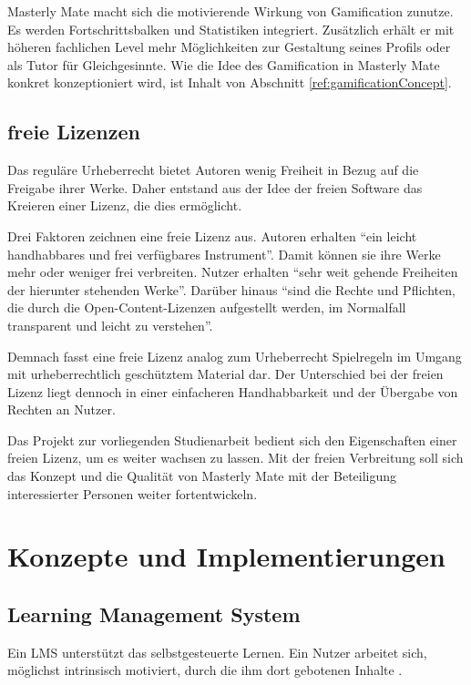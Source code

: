 Masterly Mate macht sich die motivierende Wirkung von Gamification zunutze. Es
werden Fortschrittsbalken und Statistiken integriert. Zusätzlich erhält er mit
höheren fachlichen Level mehr Möglichkeiten zur Gestaltung seines Profils oder
als Tutor für Gleichgesinnte. Wie die Idee des Gamification in Masterly Mate
konkret konzeptioniert wird, ist Inhalt von Abschnitt
\ref{ref:gamificationConcept}.

\subsection{freie Lizenzen}\label{ref:freeLicenses}
Das reguläre Urheberrecht bietet Autoren wenig Freiheit in Bezug auf die
Freigabe ihrer Werke. Daher entstand aus der Idee der freien Software das
Kreieren einer Lizenz, die dies ermöglicht.

Drei Faktoren zeichnen eine freie Lizenz aus. Autoren erhalten "`ein leicht
handhabbares und frei verfügbares Instrument"'\cite{kreutzer:2011}. Damit können
sie ihre Werke mehr oder weniger frei verbreiten. Nutzer erhalten "`sehr weit
gehende Freiheiten der hierunter stehenden Werke"'\cite{kreutzer:2011}. Darüber
hinaus "`sind die Rechte und Pflichten, die durch die Open-Content-Lizenzen
aufgestellt werden, im Normalfall transparent und leicht zu
verstehen"'\cite{kreutzer:2011}. 

Demnach fasst eine freie Lizenz analog zum Urheberrecht Spielregeln im Umgang
mit urheberrechtlich geschütztem Material dar. Der Unterschied bei der freien
Lizenz liegt dennoch in einer einfacheren Handhabbarkeit und der Übergabe von
Rechten an Nutzer.

Das Projekt zur vorliegenden Studienarbeit bedient sich den Eigenschaften einer
freien Lizenz, um es weiter wachsen zu lassen. Mit der freien Verbreitung soll
sich das Konzept und die Qualität von Masterly Mate mit der Beteiligung
interessierter Personen weiter fortentwickeln.

\section{Konzepte und Implementierungen}
\subsection{Learning Management System}
Ein LMS unterstützt das selbstgesteuerte Lernen. Ein Nutzer arbeitet sich,
möglichst intrinsisch motiviert, durch die ihm dort gebotenen Inhalte
\cite{wendt:2003}.

